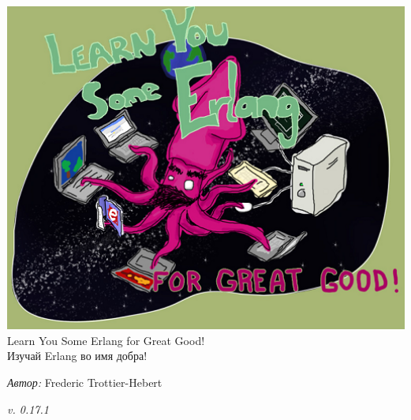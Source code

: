 \documentclass[a4paper,12pt]{report}
\begin{document}
\begin{titlepage}
    \begin{center}
        \includegraphics[width=1\textwidth]{title.png}
        \large Learn You Some Erlang for Great Good!\\
        Изучай Erlang во имя добра!
        \\[3cm]
        \begin{minipage}{1\textwidth}
                \large\emph{Автор:}
                 Frederic Trottier\--Hebert\\
        \end{minipage}
    \end{center}
    \vfill
    \begin{center}
        \emph{v. 0.17.1}
    \end{center}
\end{titlepage}



















\end{document}
